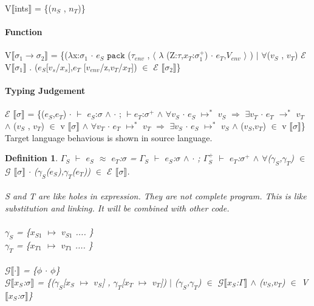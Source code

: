 \documentclass{article}
\newtheorem{definition}{Definition}[theorem]
\begin{document}
V$\llbracket$ints$\rrbracket$ = \{($n_S$ , $n_T$)\}

\paragraph{Function}	

V$\llbracket$$\sigma_1$$\rightarrow$$\sigma_2$$\rrbracket$ = \{($\lambda$x:$\sigma_1$ $\cdot$ $e_S$ $\mathtt{pack}$ ($\tau_{env}$ , $\langle$ $\lambda$ (Z:$\tau$,$x_{T}$:$\sigma_1^+$) $\cdot$ $e_T$,$V_{env}$ $\rangle$ )  $\mid$ $\forall$($v_S$ , $v_T$) $\mathcal{E}$ V$\llbracket$$\sigma_1$$\rrbracket$ . ($e_S$[$v_s$/$x_s$],$e_T$ [$v_{env}$/z,$v_T$/$x_T$]) $\in$ $\mathcal{E}$ $\llbracket$$\sigma_2$$\rrbracket$\}

\paragraph{Typing Judgement }

$\mathcal{E}$ $\llbracket$$\sigma$$\rrbracket$ = \{($e_S$,$e_T$) $\cdot$ $\vdash$ $e_S$:$\sigma$ $\wedge$ 
$\cdot$ ; $\vdash$$e_T$:$\sigma^+$ $\wedge$ 
$\forall$$v_S$ $\cdot$ $e_S$ $\longmapsto^*$ $v_S$ $\Rightarrow$ $\exists$$v_T$ $\cdot$ $e_T$ $\rightarrow^*$ $v_T$ $\wedge$ 
($v_S$ , $v_T$) $\in$ v $\llbracket$$\sigma$$\rrbracket$ $\wedge$ 
$\forall$$v_T$ $\cdot$ $e_T$ $\longmapsto^*$ $v_T$ $\Rightarrow$ $\exists$$v_S$ $\cdot$ $e_S$ $\longmapsto^*$ $v_S$ $\wedge$ 
($v_S$,$v_T$) $\in$ v $\llbracket$$\sigma$$\rrbracket$\} \\

Target language behavious is shown in source language.

\theoremstyle{definition}
\begin{definition}
$\Gamma_S$ $\vdash$ $e_S$ $\approx$ $e_T$:$\sigma$ = $\Gamma_S$ $\vdash$ $e_S$:$\sigma$ $\wedge$ $\cdot$ ; $\Gamma_S^+$ $\vdash$ $e_T$:$\sigma^+$ $\wedge$ 
$\forall$($\gamma_S$,$\gamma_T$) $\in$ $\mathcal{G}$ $\llbracket$$\sigma$$\rrbracket$ $\cdot$ ($\gamma_S$($e_S$),$\gamma_T$($e_T$)) $\in$ $\mathcal{E}$ $\llbracket$$\sigma$$\rrbracket$. \\ \\
S and T are like holes in expression. They are not complete program. This is like substitution and linking. It will be combined with other code. \\ \\
$\gamma_S$ = \{$x_{S1}$ $\longmapsto$ $v_{S1}$ .... \} \\
$\gamma_T$ = \{$x_{T1}$ $\longmapsto$ $v_{T1}$ .... \} \\ \\
$\mathcal{G}$$\llbracket$$\cdot$$\rrbracket$ = \{$\phi$ $\cdot$ $\phi$\} \\
$\mathcal{G}$$\llbracket$$x_S$:$\sigma$$\rrbracket$ = \{($\gamma_S$[$x_S$ $\longmapsto$ $v_S$] , $\gamma_T$[$x_T$ $\longmapsto$ $v_T$])
 $\mid$ ($\gamma_S$,$\gamma_T$) $\in$ $\mathcal{G}$$\llbracket$$x_S$:$\Gamma$$\rrbracket$ $\wedge$ ($v_S$,$v_T$) $\in$ V$\llbracket$$x_S$:$\sigma$$\rrbracket$\}


\end{definition}
\end{document}
